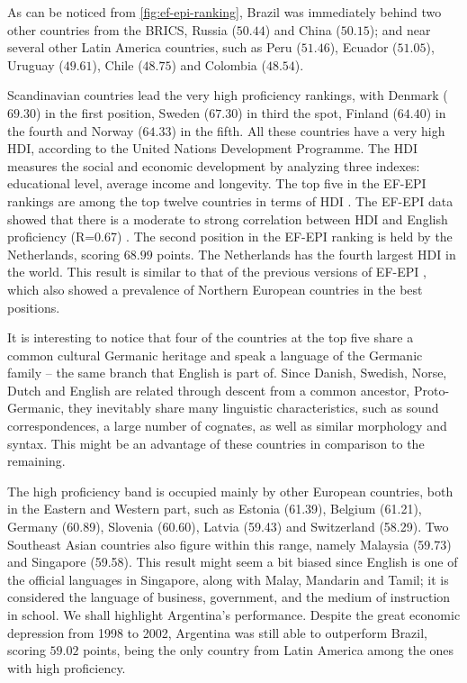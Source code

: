 As can be noticed from \autoref{fig:ef-epi-ranking}, Brazil was immediately behind two other countries from the BRICS, Russia ($50.44$) and China ($50.15$); and near several other Latin America countries, such as Peru ($51.46$), Ecuador ($51.05$), Uruguay ($49.61$), Chile ($48.75$) and Colombia ($48.54$). 

Scandinavian countries lead the very high proficiency rankings, with Denmark ($69.30$) in the first position, Sweden ($67.30$) in third the spot, Finland ($64.40$) in the fourth and Norway ($64.33$) in the fifth. All these countries have a very high \ac{HDI}, according to the United Nations Development Programme. The \ac{HDI} measures the social and economic development by analyzing three indexes: educational level, average income and longevity. The top five in the \ac{EF-EPI} rankings are among the top twelve countries in terms of \ac{HDI} \cite{HDI2014}. The \ac{EF-EPI} data showed that there is a moderate to strong correlation between \ac{HDI} and English proficiency (R=0.67) \cite{EF2014}. The second position in the \ac{EF-EPI} ranking is held by the Netherlands, scoring $68.99$ points. The Netherlands has the fourth largest \ac{HDI} in the world. This result is similar to that of the previous versions of \ac{EF-EPI} \cite{EF2013, EF2012, EF2011}, which also showed a prevalence of Northern European countries in the best positions.

It is interesting to notice that four of the countries at the top five share a common cultural Germanic heritage and speak a language of the Germanic family -- the same branch that English is part of. Since Danish, Swedish, Norse, Dutch and English are related through descent from a common ancestor, Proto-Germanic, they inevitably share many linguistic characteristics, such as sound correspondences, a large number of cognates, as well as similar morphology and syntax. This might be an advantage of these countries in comparison to the remaining.

The high proficiency band is occupied mainly by other European countries, both in the Eastern and Western part, such as Estonia (61.39), Belgium (61.21), Germany (60.89), Slovenia (60.60), Latvia (59.43) and Switzerland (58.29). Two Southeast Asian countries also figure within this range, namely Malaysia (59.73) and Singapore (59.58). This result might seem a bit biased since English is one of the official languages in Singapore, along with Malay, Mandarin and Tamil; it is considered the language of business, government, and the medium of instruction in school. We shall highlight Argentina's performance. Despite the great economic depression from 1998 to 2002, Argentina was still able to outperform Brazil, scoring $59.02$ points, being the only country from Latin America among the ones with high proficiency. 

